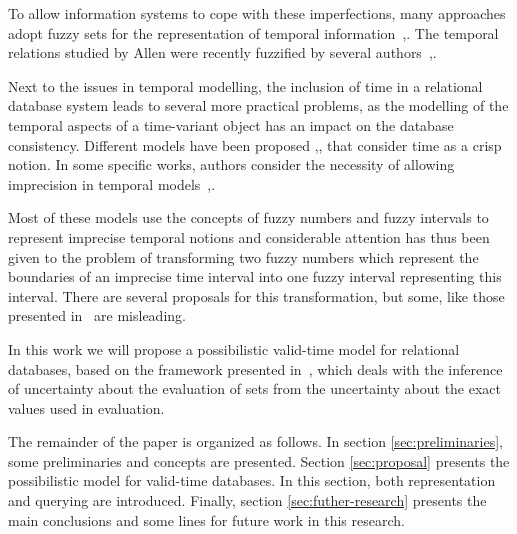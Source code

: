 To allow information systems to cope with these imperfections, many approaches adopt fuzzy sets for the representation of temporal information~\cite{Billiet:Pons:Matthe:DeTre:Pons:2011:BipolarFuzzy},\cite{Dubois:jucs_9_9:fuzziness_and_uncertainty_in}. The temporal relations studied by Allen were recently fuzzified by several authors~\cite{ohlbach04},\cite{schockaert08}.


Next to the issues in temporal modelling, the inclusion of time in a relational database system leads to several more practical problems, as the modelling of the temporal aspects of a time-variant object has an impact on the database consistency. Different models have been proposed \cite{Jensen91},\cite{Snodgrass84},\cite{Nascimento95} that consider time as a crisp notion. In some specific works, authors consider the necessity of allowing imprecision in temporal models~\cite{Cru97},\cite{Garrido2009}.

Most of these models use the concepts of fuzzy numbers and fuzzy intervals to represent imprecise temporal notions and considerable attention has thus been given to the problem of transforming two fuzzy numbers which represent the boundaries of an imprecise time interval into one fuzzy interval representing this interval. There are several proposals for this transformation, but some, like those presented in~\cite{Garrido2009} are misleading. 

In this work we will propose a possibilistic valid-time model for relational databases, based on the framework presented in~\cite{Pon11}, which deals with the inference of uncertainty about the evaluation of sets from the uncertainty about the exact values used in evaluation. 

The remainder of the paper is organized as follows. In section \ref{sec:preliminaries}, some preliminaries and concepts are presented. 
Section \ref{sec:proposal} presents the possibilistic model for valid-time databases. In this section, both representation and querying are introduced.
Finally, section \ref{sec:futher-research} presents the main conclusions and some lines for future work in this research.
